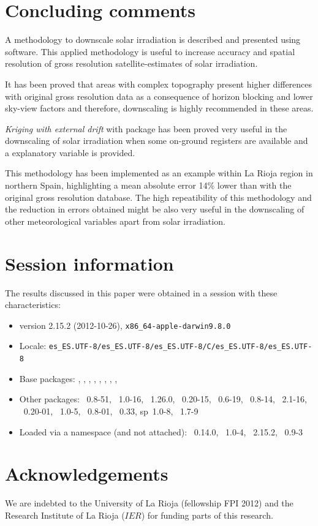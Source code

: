\documentclass[article]{jss}
\begin{document}
\section{Concluding comments}
A methodology to downscale solar irradiation is described and
presented using  software. This applied methodology is
useful to increase accuracy and spatial resolution of gross resolution
satellite-estimates of solar irradiation.

It has been proved that areas with complex topography present higher
differences with original gross resolution data as a consequence of
horizon blocking and lower sky-view factors and therefore, downscaling
is highly recommended in these areas.

\emph{Kriging with external drift} with  package has been
proved very useful in the downscaling of solar irradiation when some
on-ground registers are available and a explanatory variable is
provided.
  
This methodology has been implemented as an example within La Rioja
region in northern Spain, highlighting a mean absolute error 14\%
lower than with the original gross resolution database. The high
repeatibility of this methodology and the reduction in errors obtained might be also very useful in the
downscaling of other meteorological variables apart from solar
irradiation.

\section*{Session information}
\label{sec:session}

The results discussed in this paper were obtained in a session with
these characteristics:

\begin{itemize}\raggedright
  \item {} version 2.15.2 (2012-10-26), \verb|x86_64-apple-darwin9.8.0|
  \item Locale: \verb|es_ES.UTF-8/es_ES.UTF-8/es_ES.UTF-8/C/es_ES.UTF-8/es_ES.UTF-8|
  \item Base packages: , , , , , , , ,
  \item Other packages: ~0.8-51, ~1.0-16, ~1.26.0, ~0.20-15,
    ~0.6-19, ~0.8-14, ~2.1-16, ~0.20-01,
    ~1.0-5, ~0.8-01, ~0.33, sp~1.0-8, ~1.7-9
  \item Loaded via a namespace (and not attached): ~0.14.0, ~1.0-4,
    ~2.15.2, ~0.9-3
\end{itemize}


\section*{Acknowledgements}
We are indebted to the University of La Rioja (fellowship FPI 2012)
and the Research Institute of La Rioja ($IER$) for funding parts of
this research.



\end{document}
